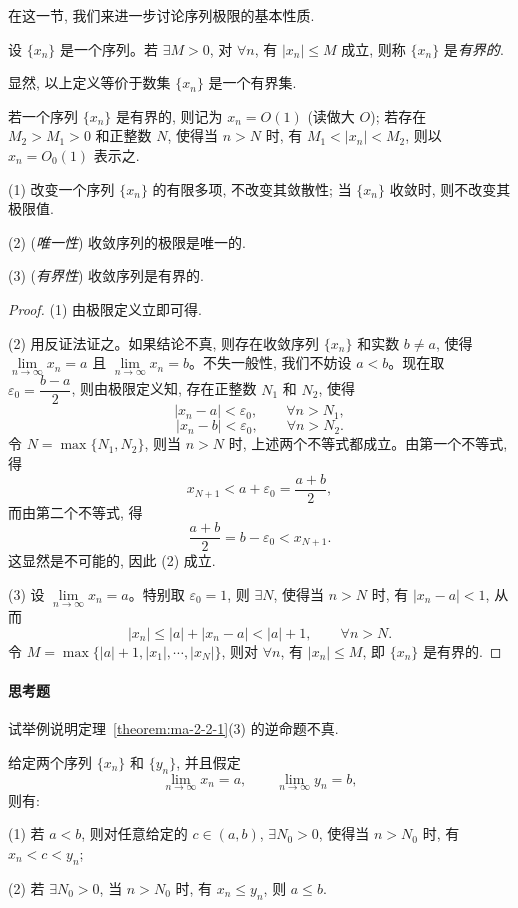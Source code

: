 在这一节, 我们来进一步讨论序列极限的基本性质.

\begin{definition}\label{definition:ma-2-2-1}
设 $\{x_n\}$ 是一个序列。若 $\exists M>0$, 对 $\forall n$, 有 $|x_n|\leqslant M$ 成立, 则称 $\{x_n\}$ 是\emph{有界的}.
\end{definition}

显然, 以上定义等价于数集 $\{x_n\}$ 是一个有界集.

若一个序列 $\{x_n\}$ 是有界的, 则记为 $x_n=O(1)$ (读做大 $O$); 若存在 $M_2>M_1>0$ 和正整数 $N$, 使得当 $n>N$ 时, 有 $M_1<|x_n|<M_2$, 则以 $x_n=O_0(1)$ 表示之.

\begin{theorem}\label{theorem:ma-2-2-1}
(1) 改变一个序列 $\{x_n\}$ 的有限多项, 不改变其敛散性; 当 $\{x_n\}$ 收敛时, 则不改变其极限值.

(2) (\emph{唯一性}) 收敛序列的极限是唯一的.

(3) (\emph{有界性}) 收敛序列是有界的.
\end{theorem}


\begin{proof}
(1) 由极限定义立即可得.

(2) 用反证法证之。如果结论不真, 则存在收敛序列 $\{x_n\}$ 和实数 $b\ne a$, 使得 $\lim\limits_{n\to\infty}x_n=a$ 且 $\lim\limits_{n\to\infty}x_n=b$。不失一般性, 我们不妨设 $a<b$。现在取 $\varepsilon_0=\dfrac{b-a}{2}$, 则由极限定义知, 存在正整数 $N_1$ 和 $N_2$, 使得
\[
  |x_n-a|<\varepsilon_0,\qquad \forall n>N_1,
\]
\[
  |x_n-b|<\varepsilon_0,\qquad \forall n>N_2.
\]
令 $N=\max\{N_1,N_2\}$, 则当 $n>N$ 时, 上述两个不等式都成立。由第一个不等式, 得
\[
  x_{N+1}<a+\varepsilon_0=\frac{a+b}{2},
\]
而由第二个不等式, 得
\[
  \frac{a+b}{2}=b-\varepsilon_0<x_{N+1}.
\]
这显然是不可能的, 因此 (2) 成立.

(3) 设 $\lim\limits_{n\to\infty}x_n=a$。特别取 $\varepsilon_0=1$, 则 $\exists N$, 使得当 $n>N$ 时, 有 $|x_n-a|<1$, 从而
\[
  |x_n|\leqslant |a|+|x_n-a|<|a|+1,\qquad \forall n>N.
\]
令 $M=\max\{|a|+1,|x_1|,\cdots,|x_N|\}$, 则对 $\forall n$, 有 $|x_n|\leqslant M$, 即 $\{x_n\}$ 是有界的.
\end{proof}


\paragraph*{思考题}
试举例说明定理~\ref{theorem:ma-2-2-1}(3) 的逆命题不真.

\begin{theorem}[{保序性}]\label{theorem:ma-2-2-2}
给定两个序列 $\{x_n\}$ 和 $\{y_n\}$, 并且假定
\[
  \lim_{n\to\infty}x_n=a,\qquad
  \lim_{n\to\infty}y_n=b,
\]
则有:

(1) 若 $a<b$, 则对任意给定的 $c\in(a,b)$, $\exists N_0>0$, 使得当 $n>N_0$ 时, 有 $x_n<c<y_n$;

(2) 若 $\exists N_0>0$, 当 $n>N_0$ 时, 有 $x_n\leqslant y_n$, 则 $a\leqslant b$.
\end{theorem}


